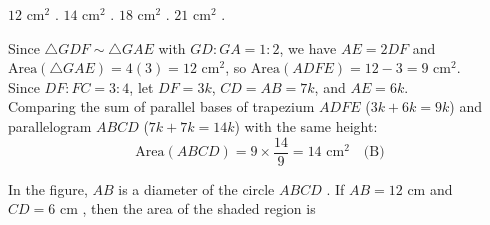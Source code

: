 \begin{minipage}{0.45\textwidth}
\begin{choices}
    \choice $12\text{ cm}^2$ .
    \correctchoice $14\text{ cm}^2$ .
    \choice $18\text{ cm}^2$ .
    \choice $21\text{ cm}^2$ .
\end{choices}
\end{minipage}
\begin{minipage}{0.52\textwidth}
\centering
{}
\end{minipage}
\begin{solution}
Since $\triangle GDF \sim \triangle GAE$ with $GD : GA = 1 : 2$, we have $AE = 2DF$ and $\text{Area}(\triangle GAE) = 4(3) = 12\text{ cm}^2$, so $\text{Area}(ADFE) = 12 - 3 = 9\text{ cm}^2$. \\
Since $DF : FC = 3 : 4$, let $DF = 3k$, $CD = AB = 7k$, and $AE = 6k$. \\
Comparing the sum of parallel bases of trapezium $ADFE$ ($3k + 6k = 9k$) and parallelogram $ABCD$ ($7k + 7k = 14k$) with the same height:
\[ \text{Area}(ABCD) = 9 \times \frac{14}{9} = 14\text{ cm}^2 \quad \text{(B)} \]
\end{solution}

\question In the figure, $AB$ is a diameter of the circle $ABCD$ . If $AB = 12\text{ cm}$ and $CD = 6\text{ cm}$ , then the area of the shaded region is

